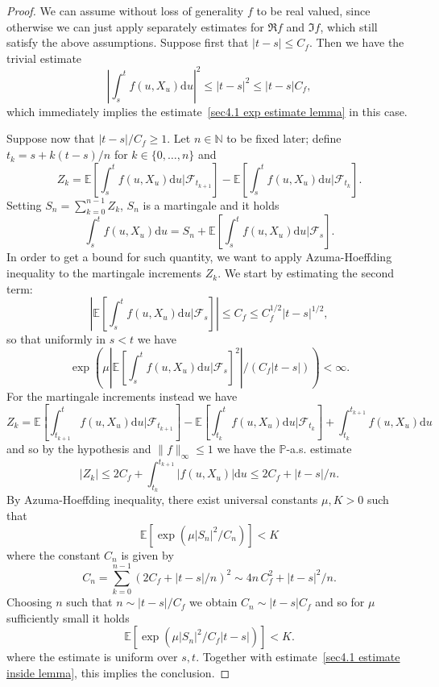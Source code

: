 \documentclass[10pt]{article}
\newcommand{\mathd}{\mathrm{d}}
\begin{document}
\begin{proof}
  We can assume without loss of generality $f$ to be real valued, since otherwise we can just apply
  separately estimates for $\Re f$ and $\Im f$, which still satisfy the above
  assumptions. Suppose first that $| t - s | \leqslant C_f$. Then we have the
  trivial estimate
  \[ \left| \int_s^t f (u, X_u) \mathd u \right|^2 \leqslant | t - s |^2
     \leqslant | t - s | C_f, \]
  which immediately implies the estimate~\eqref{sec4.1 exp estimate lemma} in
  this case.
  
  Suppose now that $| t - s | / C_f  \geqslant 1$. Let $n \in \mathbb{N}$ to
  be fixed later; define $t_k = s + k (t - s) / n$ for $k \in \{ 0, \ldots, n
  \}$ and
  \[ Z_k =\mathbb{E} \left[ \int_s^t f (u, X_u) \mathd u | \mathcal{F}_{t_{k
     + 1}} \right] -\mathbb{E} \left[ \int_s^t f (u, X_u) \mathd u | 
     \mathcal{F}_{t_k} \right] . \]
  Setting $S_n = \sum_{k = 0}^{n - 1} Z_k$, $S_n$ is a martingale and it holds
  \[ \int_s^t f (u, X_u) \mathd u = S_n +\mathbb{E} \left[ \int_s^t f (u, X_u)
     \mathd u | \mathcal{F}_s \right] . \]
  In order to get a bound for such quantity, we want to apply
  Azuma\mbox{-}Hoeffding inequality to the martingale increments $Z_k$. We
  start by estimating the second term:
  \[ \left| \mathbb{E} \left[ \int_s^t f (u, X_u) \mathd u | \mathcal{F}_s
     \right] \right| \leqslant C_f \leqslant C_f^{1 / 2} | t - s |^{1 / 2}, \]
  so that uniformly in $s < t$ we have
  \begin{equation}
    \exp \left( \mu \left| \mathbb{E} \left[ \int_s^t f (u, X_u) \mathd u |
    \mathcal{F}_s \right]^2 \right| / (C_f | t - s |) \right) < \infty .
    \label{sec4.1 estimate inside lemma}
  \end{equation}
  For the martingale increments instead we have
  \[ Z_k =\mathbb{E} \left[ \int_{t_{k + 1}}^t f (u, X_u) \mathd u |
     \mathcal{F}_{t_{k + 1}} \right] -\mathbb{E} \left[ \int_{t_k}^t f (u,
     X_u) \mathd u | \mathcal{F}_{t_k} \right] + \int_{t_k}^{t_{k + 1}} f (u,
     X_u) \mathd u \]
  and so by the hypothesis and $\| f \|_{\infty} \leqslant 1$ we have the
  $\mathbb{P}$-a.s. estimate
  \[ | Z_k | \leqslant 2 C_f + \int_{t_k}^{t_{k + 1}} | f (u, X_u) | \mathd u
     \leqslant 2 C_f + | t - s | / n. \]
  By Azuma\mbox{-}Hoeffding inequality, there exist universal constants $\mu,
  K > 0$ such that
  \[ \mathbb{E} [\exp (\mu | S_n |^2 / C_n)] < K \]
  where the constant $C_n$ is given by
  \[ C_n = \sum_{k = 0}^{n - 1} (2 C_f + | t - s | / n)^2 \sim 4 n \, C_f^2 +
     | t - s |^2 / n. \]
  Choosing $n$ such that $n \sim | t - s | / C_f$ we obtain $C_n \sim | t - s
  | C_f$ and so for $\mu$ sufficiently small it holds
  \[ \mathbb{E} [\exp (\mu | S_n |^2 / C_f | t - s |)] < K. \]
  where the estimate is uniform over $s, t$. Together with
  estimate~\eqref{sec4.1 estimate inside lemma}, this implies the conclusion.
\end{proof}
\end{document}
